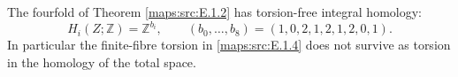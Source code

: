 \begin{theorem}\label{maps:src:E.1.5}


The fourfold of Theorem \ref{maps:src:E.1.2} has torsion-free integral homology:
\[
 H_i(Z;\mathbb Z)=\mathbb Z^{b_i},\qquad
 (b_0,\ldots,b_8)=(1,0,2,1,2,1,2,0,1).
\]
In particular the finite-fibre torsion in \ref{maps:src:E.1.4} does not survive
as torsion in the homology of the total space.

\end{theorem}


